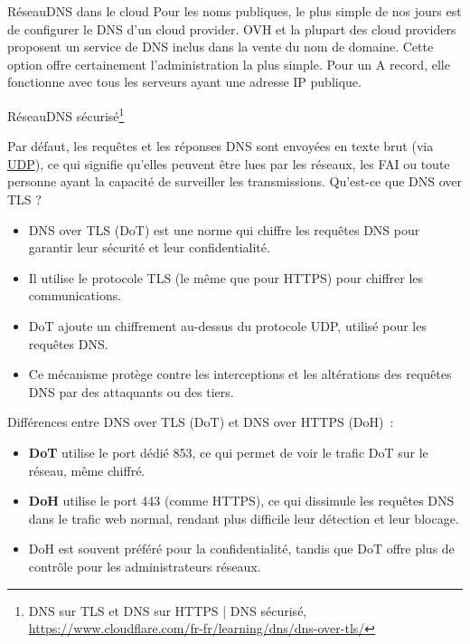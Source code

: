 \documentclass{beamer}
\begin{document}
    \begin{frame}{Réseau}{DNS dans le cloud}
        Pour les noms publiques, le plus simple de nos jours est de configurer le DNS d'un cloud provider.
        \bigbreak
        OVH et la plupart des cloud providers proposent un service de DNS inclus dans la vente du nom de domaine.
        \bigbreak
        Cette option offre certainement l'administration la plus simple.
        Pour un A record, elle fonctionne avec tous les serveurs ayant une adresse IP publique.
    \end{frame}

    \begin{frame}{Réseau}{DNS sécurisé\footnote{\label{doh-dot}DNS sur TLS et DNS sur HTTPS | DNS sécurisé, \url{https://www.cloudflare.com/fr-fr/learning/dns/dns-over-tls/}}}
        \begin{small}
            Par défaut, les requêtes et les réponses DNS sont envoyées en texte brut (via \href{https://www.cloudflare.com/learning/ddos/glossary/user-datagram-protocol-udp/}{UDP}), ce qui signifie qu'elles peuvent être lues par les réseaux, les FAI ou toute personne ayant la capacité de surveiller les transmissions.
            Qu'est-ce que DNS over TLS ?
            \begin{itemize}
                \item DNS over TLS (DoT) est une norme qui chiffre les requêtes DNS pour garantir leur sécurité et leur confidentialité.
                \item Il utilise le protocole TLS (le même que pour HTTPS) pour chiffrer les communications.
                \item DoT ajoute un chiffrement au-dessus du protocole UDP, utilisé pour les requêtes DNS.
                \item Ce mécanisme protège contre les interceptions et les altérations des requêtes DNS par des attaquants ou des tiers.
            \end{itemize}
            Différences entre DNS over TLS (DoT) et DNS over HTTPS (DoH)~:
            \begin{itemize}
                \item \textbf{DoT} utilise le port dédié 853, ce qui permet de voir le trafic DoT sur le réseau, même chiffré.
                \item \textbf{DoH} utilise le port 443 (comme HTTPS), ce qui dissimule les requêtes DNS dans le trafic web normal, rendant plus difficile leur détection et leur blocage.
                \item DoH est souvent préféré pour la confidentialité, tandis que DoT offre plus de contrôle pour les administrateurs réseaux.
            \end{itemize}
        \end{small}
    \end{frame}
\end{document}
